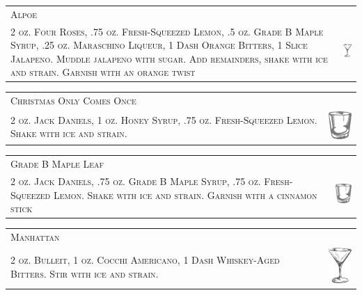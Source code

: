 \documentclass{article}
\begin{document}
\begin{tabular}{b{2.5in} m{0.625in}}
  \multicolumn{2}{p{3.0in}}{\centering\Huge\textsc{Alpoe}} \\ 
  
  \textsc{2 oz. Four Roses, .75 oz. Fresh-Squeezed Lemon, .5 oz. Grade
    B Maple Syrup, .25 oz.  Maraschino Liqueur, 1 Dash Orange Bitters,
    1 Slice Jalapeno. Muddle jalapeno with sugar. Add remainders,
    shake with ice and strain. Garnish with an orange twist} &
  \includegraphics[width=0.5in]{goblet.png}
\end{tabular}

\begin{tabular}{b{2.5in} m{0.625in}}
  \multicolumn{2}{p{3.0in}}{\centering\Huge\textsc{Christmas Only Comes Once}} \\ 
  
  \textsc{2 oz. Jack Daniels, 1 oz. Honey Syrup, .75 oz.
    Fresh-Squeezed Lemon. Shake with ice and strain.} &
  \includegraphics[width=0.5in]{rocks_glass.png}
\end{tabular}

\begin{tabular}{b{2.5in} m{0.625in}}
  \multicolumn{2}{p{3.0in}}{\centering\Huge\textsc{Grade B Maple Leaf}} \\ 
  
  \textsc{2 oz. Jack Daniels, .75 oz. Grade B Maple Syrup, .75
    oz. Fresh-Squeezed Lemon. Shake with ice and strain.  Garnish with
    a cinnamon stick} & \includegraphics[width=0.5in]{rocks_glass.png}
\end{tabular}

\begin{tabular}{b{2.5in} m{0.625in}}
  \multicolumn{2}{p{3.0in}}{\centering\Huge\textsc{Manhattan}} \\ 
  
  \textsc{2 oz. Bulleit, 1 oz. Cocchi Americano, 1 Dash Whiskey-Aged
    Bitters. Stir with ice and strain.} &
  \includegraphics[width=0.5in]{goblet.png}
\end{tabular}
\end{document}
